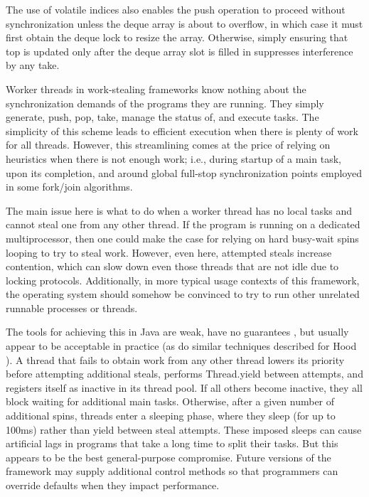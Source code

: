 The use of volatile indices also enables the push operation to proceed
without synchronization unless the deque array is about to overflow,
in which case it must first obtain the deque lock to resize the
array. Otherwise, simply ensuring that top is updated only after the
deque array slot is filled in suppresses interference by any take.


Worker threads in work-stealing frameworks know nothing about the
synchronization demands of the programs they are running. They simply
generate, push, pop, take, manage the status of, and execute
tasks. The simplicity of this scheme leads to efficient execution when
there is plenty of work for all threads. However, this streamlining
comes at the price of relying on heuristics when there is not enough
work; i.e., during startup of a main task, upon its completion, and
around global full-stop synchronization points employed in some
fork/join algorithms.

The main issue here is what to do when a worker thread has no local
tasks and cannot steal one from any other thread. If the program is
running on a dedicated multiprocessor, then one could make the case
for relying on hard busy-wait spins looping to try to steal
work. However, even here, attempted steals increase contention, which
can slow down even those threads that are not idle due to locking
protocols.  Additionally, in more typical usage contexts of this
framework, the operating system should somehow be convinced to try to
run other unrelated runnable processes or threads.

The tools for achieving this in Java are weak, have no guarantees
\cite{Goetz2006}, but usually appear to be acceptable in practice (as
do similar techniques described for Hood \cite{Blumofe1998}). A thread
that fails to obtain work from any other thread lowers its priority
before attempting additional steals, performs Thread.yield between
attempts, and registers itself as inactive in its thread pool. If all
others become inactive, they all block waiting for additional main
tasks. Otherwise, after a given number of additional spins, threads
enter a sleeping phase, where they sleep (for up to 100ms) rather than
yield between steal attempts. These imposed sleeps can cause
artificial lags in programs that take a long time to split their
tasks. But this appears to be the best general-purpose
compromise. Future versions of the framework may supply additional
control methods so that programmers can override defaults when they
impact performance.

